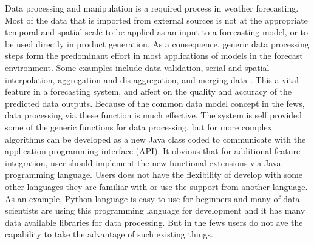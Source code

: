 Data processing and manipulation is a required process in weather forecasting. Most of the data that is imported from external sources is not at the appropriate temporal and spatial scale to be applied as an input to a forecasting model, or to be used directly in product generation. As a consequence, generic data processing steps form the predominant effort in most applications of models in the forecast environment. Some examples include data validation, serial and spatial interpolation, aggregation and dis-aggregation, and merging data \cite{Werner2013TheSystem}. This a vital feature in a forecasting system, and affect on the quality and accuracy of the predicted data outputs. Because of the common data model concept in the \acrshort{fews}, data processing via these function is much effective. The system is self provided some of the generic functions for data processing, but for more complex algorithms can be developed as a new Java class coded to communicate with the application programming interface (API). It obvious that for additional feature integration, user should implement the new functional extensions via Java programming language. Users does not have the flexibility of develop with some other languages they are familiar with or use the support from another language. As an example, Python language is easy to use for beginners and many of data scientists are using this programming language for development and it has many data available libraries for data processing. But in the \acrshort{fews} users do not ave the capability to take the advantage of such existing things.

